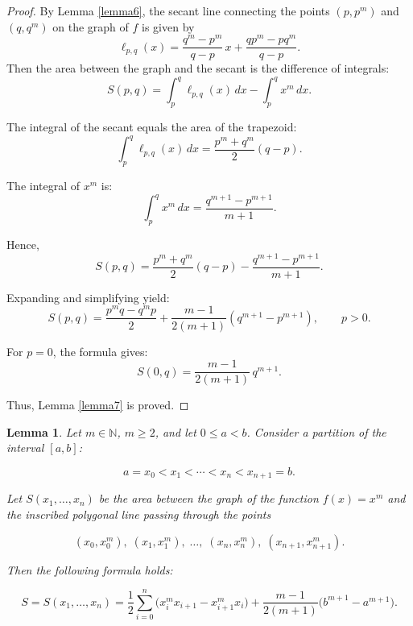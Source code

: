 \documentclass[amstex,16pt, amssymb]{article}
\theoremstyle{plain}
\newtheorem{lemma}{Lemma}[section]
\theoremstyle{definition}
\numberwithin{equation}{section}
\numberwithin{equation}{section}
\begin{document}
\begin{proof}
By Lemma \ref{lemma6}, the secant line connecting the points $(p, p^m)$ and $(q, q^m)$ on the graph of $f$ is given by
\[
\ell_{p,q}(x)=\frac{q^{m}-p^{m}}{q-p}\,x+\frac{qp^{m}-pq^{m}}{q-p}.
\]
Then the area between the graph and the secant is the difference of integrals:
\[
S(p,q) = \int_p^q \ell_{p,q}(x)\,dx - \int_p^q x^m\,dx.
\]

The integral of the secant equals the area of the trapezoid:
\[
\int_p^q \ell_{p,q}(x)\,dx = \frac{p^m + q^m}{2}(q-p).
\]

The integral of $x^m$ is:
\[
\int_p^q x^m\,dx = \frac{q^{m+1} - p^{m+1}}{m+1}.
\]

Hence,
\[
S(p,q) = \frac{p^m + q^m}{2}(q-p) - \frac{q^{m+1} - p^{m+1}}{m+1}.
\]

Expanding and simplifying yield:
\[
S(p,q) = \frac{p^m q - q^m p}{2} + \frac{m-1}{2(m+1)}(q^{m+1} - p^{m+1}), \qquad p > 0.
\]

For $p = 0$, the formula gives:
\[
S(0,q) = \frac{m-1}{2(m+1)}\, q^{m+1}.
\]

Thus, Lemma \ref{lemma7} is proved. 
\end{proof}




\begin{lemma}\label{lemma8}
Let \( m \in \mathbb{N} \), \( m \geq 2 \), and let \( 0 \leq a < b \).
Consider a partition of the interval \([a, b]\):

\[
a = x_0 < x_1 < \cdots < x_n < x_{n+1} = b.
\]

Let \( S(x_1, \dots, x_n) \) be the area between the graph of the function
\( f(x) = x^m \) and the inscribed polygonal line passing through the points

\[
(x_0, x_0^m), \; (x_1, x_1^m), \; \dots, \; (x_n, x_n^m), \; (x_{n+1}, x_{n+1}^m).
\]

Then the following formula holds:

\[
S=S(x_1, \dots, x_n) =
\frac{1}{2} \sum_{i=0}^{n} \bigl( x_i^m x_{i+1} - x_{i+1}^m x_i \bigr)
+ \frac{m-1}{2(m+1)} \bigl( b^{m+1} - a^{m+1} \bigr).
\]

\end{lemma}
\end{document}
